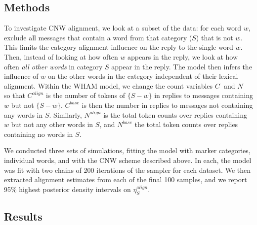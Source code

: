 \documentclass[11pt]{article}
\begin{document}
\subsection{Methods}

To investigate CNW alignment, we look at a subset of the data: for each word $w$, exclude all messages that contain a word from that category ($S$) that is not $w$. This limits the category alignment influence on the reply to the single word $w$. Then, instead of looking at how often $w$ appears in the reply, we look at how often \emph{all other words} in category $S$ appear in the reply.  The model then infers the influence of $w$ on the other words in the category independent of their lexical alignment. Within the WHAM model, we change the count variables $C^\cdot$ and $N^\cdot$ so that $C^{align}$ is the number of tokens of $\{S-w\}$ in replies to messages containing $w$ but not $\{S - w\}$. $C^{base}$ is then the number in replies to messages not containing any words in $S$.  Similarly, $N^{align}$ is the total token counts over replies containing $w$ but not any other words in $S$, and $N^{base}$ the total token counts over replies containing no words in $S$.

We conducted three sets of simulations, fitting the model with marker categories, individual words, and with the CNW scheme described above.
In each, the model was fit with two chains of 200 iterations of the sampler for each dataset.  We then extracted alignment estimates from each of the final 100 samples, and we report 95\% highest posterior density intervals on  $\eta^{align}_S$. %

\subsection{Results}
\end{document}
